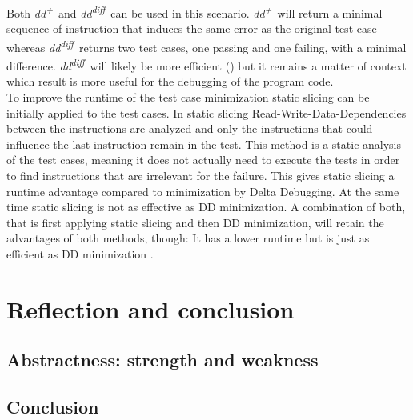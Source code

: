 \documentclass[a4paper,UKenglish]{lipics-v2018}
\newcommand{\ddp}{\textit{dd\textsuperscript{+}}}
\newcommand{\dddiff}{\textit{dd\textsuperscript{diff}}}
\begin{document}
Both \ddp\ and \dddiff\ can be used in this scenario. \ddp\ will return a minimal sequence of instruction that induces the same error as the original test case whereas \dddiff\ returns two test cases, one passing and one failing, with a minimal difference. \dddiff\ will likely be more efficient (\cite{Zeller:2002:SIF:506201.506206})
 but it remains a matter of context which result is more useful for the debugging of the program code.\\

To improve the runtime of the test case minimization static slicing can be initially applied to the test cases. In static slicing Read-Write-Data-Dependencies between the instructions are analyzed and only the instructions that could influence the last instruction remain in the test. This method is a static analysis of the test cases, meaning it does not actually need to execute the tests in order to find instructions that are irrelevant for the failure. This gives static slicing a runtime advantage compared to minimization by Delta Debugging. At the same time static slicing is not as effective as DD minimization. A combination of both, that is first applying static slicing and then DD minimization, will retain the advantages of both methods, though: It has a lower runtime but is just as efficient as DD minimization \cite{Leitner:2007:EUT:1321631.1321698}.

\section{Reflection and conclusion}
\subsection{Abstractness: strength and weakness}
\subsection{Conclusion}


\end{document}
